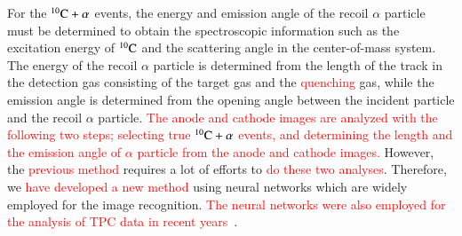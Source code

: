 \documentclass{jps-cp}
\begin{document}
For the ${}^{10}\rm{C}+\alpha$ events, the energy and emission angle of the recoil $\alpha$ particle must
be determined to obtain the spectroscopic information such as the excitation energy of ${}^{10}\rm{C}$
and the scattering angle in the center-of-mass system.
The energy of the recoil $\alpha$ particle is determined from the length of the track in the detection gas consisting of the target gas and the \textcolor{red}{quenching} gas,
while the emission angle is determined from the opening angle between the incident particle and the recoil $\alpha$ particle.
\textcolor{red}{The anode and cathode images are analyzed with the following two steps;
  selecting true ${}^{10}\rm{C}+\alpha$ events,
  and determining the length and the emission angle of $\alpha$ particle from
  the anode and cathode images.}
However, the \textcolor{red}{previous method} requires a lot of efforts to
\textcolor{red}{do these two analyses}.
Therefore, we \textcolor{red}{have developed a new method} using neural networks which are widely employed for the image recognition.
\textcolor{red}{The neural networks were also employed for the analysis of TPC data in recent years~\cite{attpc}}.
\end{document}
